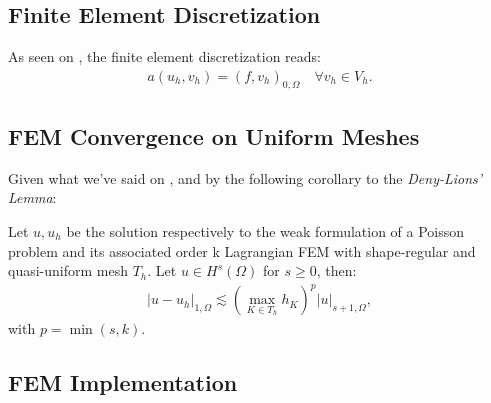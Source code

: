 \subsection{Finite Element Discretization}
As seen on , the finite element discretization reads:
\begin{gather}
	a(u_h, v_h) = (f, v_h)_{0, \Omega} \quad \forall v_h \in V_h.
\end{gather}

\subsection{FEM Convergence on Uniform Meshes}

Given what we've said on , and by the following corollary to the \textit{Deny-Lions' Lemma}:

\begin{theorem}
	Let $u, u_h$ be the solution respectively to the weak formulation of a Poisson problem and its associated order k Lagrangian FEM with shape-regular and quasi-uniform mesh $T_h$. Let $u \in H^s(\Omega)$ for $s \ge 0$, then:
	\begin{gather}
		|u - u_h|_{1, \Omega} \lesssim (\max_{K \in T_h} h_K)^{p}|u|_{s+1, \Omega},
	\end{gather}
	with $p = \min(s, k)$.
\end{theorem}

\subsection{FEM Implementation}

